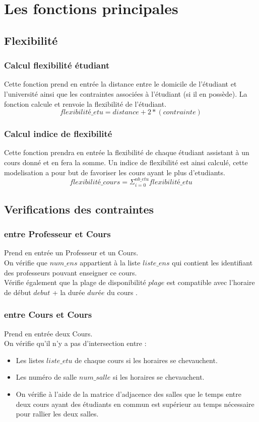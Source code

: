 \documentclass[a4paper,11pt]{article}
\begin{document}
\section{Les fonctions principales}
	\subsection{Flexibilité}
		\subsubsection{Calcul flexibilité étudiant}
		Cette fonction prend en entrée la distance entre le domicile de l'étudiant et l'université ainsi que les contraintes
		associées à l'étudiant (si il en possède). La fonction calcule et renvoie la flexibilité de l'étudiant.
		$$flexibilité\_etu  = distance + 2*(contrainte)$$
		\subsubsection{Calcul indice de flexibilité}
		Cette fonction prendra en entrée la flexibilité de chaque étudiant assistant à un cours donné et en fera la somme. 
		Un indice de flexibilité est ainsi calculé, cette modelisation a pour but de favoriser les cours ayant le plus d'etudiants.\\
		$$flexibilité\_cours = \Sigma_{i = 0}^{nb\_etu} flexibilité\_etu$$
	\subsection{Verifications des contraintes}
		\subsubsection{entre Professeur et Cours}
			Prend en entrée un Professeur et un Cours.\\
			On vérifie que $num\_ens$ appartient à la liste $liste\_ens$ qui contient les identifiant des professeurs pouvant enseigner ce cours.\\
			Vérifie également que la plage de disponibilité $plage$ est compatible avec l'horaire de début $debut$ + la durée $durée$ du cours .
		\subsubsection{entre Cours et Cours}
			Prend en entrée deux Cours.\\
			On vérifie qu'il n'y a pas d'intersection entre :\\
			\begin{itemize}
				\item Les listes $liste\_etu$ de chaque cours si les horaires se chevauchent.
				\item Les numéro de salle $num\_salle$ si les horaires se chevauchent.
				\item On vérifie à l'aide de la matrice d'adjacence des salles que le temps entre deux cours ayant des étudiants en commun est supérieur au temps nécessaire pour rallier les deux salles.
			\end{itemize}
\end{document}
